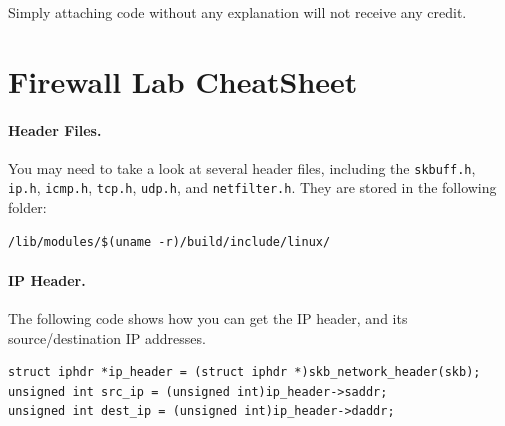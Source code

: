 \iffalse
Simply attaching code without any explanation will not receive any credit.



\vspace{.2in}






\newpage
\appendix

\section{Firewall Lab CheatSheet} 
\label{sec:cheatsheet}

\paragraph{Header Files.} You may need to take a look at several header
files, including the {\tt skbuff.h}, {\tt ip.h}, {\tt icmp.h}, 
{\tt tcp.h}, {\tt udp.h}, and {\tt netfilter.h}. They are stored in
the following folder: 
\begin{Verbatim}[frame=single]
/lib/modules/$(uname -r)/build/include/linux/
\end{Verbatim}


\paragraph{IP Header.}
The following code shows how you can get the IP header, and its 
source/destination IP addresses. 
\begin{Verbatim}[frame=single]
struct iphdr *ip_header = (struct iphdr *)skb_network_header(skb);
unsigned int src_ip = (unsigned int)ip_header->saddr;
unsigned int dest_ip = (unsigned int)ip_header->daddr;
\end{Verbatim}

